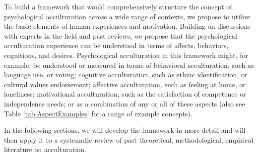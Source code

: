 \documentclass[man, 12pt, a4paper]{apa7}
\begin{document}
To build a framework that would comprehensively structure the concept of psychological acculturation across a wide range of contexts, we propose to utilize the basic elements of human experiences and motivation.
Building on discussions with experts in the field and past reviews, we propose that the psychological acculturation experience can be understood in terms of affects, behaviors, cognitions, and desires. Psychological acculturation in this framework might, for example, be understood or measured in terms of behavioral acculturation, such as language use, or voting; cognitive acculturation, such as ethnic identification, or cultural values endorsement; affective acculturation, such as feeling at home, or loneliness; motivational acculturation, such as the satisfaction of competence or independence needs; or as a combination of any or all of these aspects (also see Table \ref{tab:AspectExamples} for a range of example concepts). 

In the following sections, we will develop the framework in more detail and will then apply it to a systematic review of past theoretical, methodological, empirical literature on acculturation.


\end{document}
